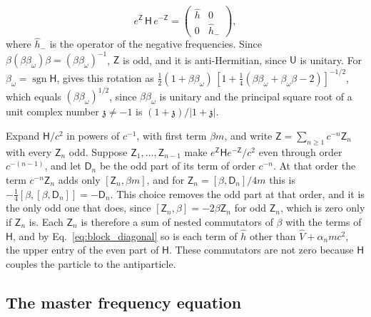 \documentclass[aps,prd,onecolumn,tightenlines,nofootinbib,notitlepage,11pt,floatfix]{revtex4-2}
\theoremstyle{indentedtheorem}
\begin{document}
\begin{equation}
    e^{\mathsf{Z}}\,\mathsf{H}\,e^{-\mathsf{Z}} = \begin{pmatrix} \hat{h} & 0 \\ 0 & \hat{h}_- \end{pmatrix} ,
    \label{eq:block_diagonal}
\end{equation}
where $\hat{h}_-$ is the operator of the negative frequencies. Since $\beta(\beta\beta_\omega)\beta=(\beta\beta_\omega)^{-1}$, $\mathsf{Z}$ is odd, and it is anti-Hermitian, since $\mathsf{U}$ is unitary. For $\beta_\omega=\operatorname{sgn}\mathsf{H}$, \citet{Eriksen1958Foldy} gives this rotation as $\tfrac{1}{2}(1+\beta\beta_\omega)\,[1+\tfrac{1}{4}(\beta\beta_\omega+\beta_\omega\beta-2)]^{-1/2}$, which equals $(\beta\beta_\omega)^{1/2}$, since $\beta\beta_\omega$ is unitary and the principal square root of a unit complex number $\mathfrak{z}\neq-1$ is $(1+\mathfrak{z})/|1+\mathfrak{z}|$.

Expand $\mathsf{H}/c^2$ in powers of $c^{-1}$, with first term $\beta m$, and write $\mathsf{Z}=\sum_{n\ge1}c^{-n}\mathsf{Z}_n$ with every $\mathsf{Z}_n$ odd. Suppose $\mathsf{Z}_1,\ldots,\mathsf{Z}_{n-1}$ make $e^{\mathsf{Z}}\mathsf{H}e^{-\mathsf{Z}}/c^2$ even through order $c^{-(n-1)}$, and let $\mathsf{D}_n$ be the odd part of its term of order $c^{-n}$. At that order the term $c^{-n}\mathsf{Z}_n$ adds only $[\mathsf{Z}_n,\beta m]$, and for $\mathsf{Z}_n=[\beta,\mathsf{D}_n]/4m$ this is $-\tfrac{1}{4}[\beta,[\beta,\mathsf{D}_n]]=-\mathsf{D}_n$. This choice removes the odd part at that order, and it is the only odd one that does, since $[\mathsf{Z}_n,\beta]=-2\beta\mathsf{Z}_n$ for odd $\mathsf{Z}_n$, which is zero only if $\mathsf{Z}_n$ is. Each $\mathsf{Z}_n$ is therefore a sum of nested commutators of $\beta$ with the terms of $\mathsf{H}$, and by Eq.~\eqref{eq:block_diagonal} so is each term of $\hat{h}$ other than $\hat{V}+\alpha_nmc^2$, the upper entry of the even part of $\mathsf{H}$. These commutators are not zero because $\mathsf{H}$ couples the particle to the antiparticle.

\subsection{The master frequency equation}
\label{sec:master_equation_sub}
\end{document}
